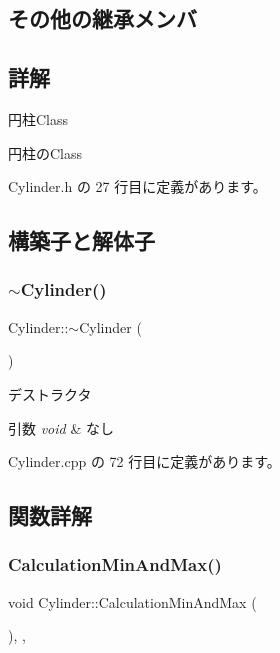 \subsection*{その他の継承メンバ}


\subsection{詳解}
円柱\+Class 

円柱の\+Class 

 Cylinder.\+h の 27 行目に定義があります。



\subsection{構築子と解体子}
\mbox{\label{class_cylinder_a05ab556f0ae3cd6e99d9d1f3caca80b3}} 
\subsubsection{\texorpdfstring{$\sim$\+Cylinder()}{~Cylinder()}}
{\footnotesize\ttfamily Cylinder\+::$\sim$\+Cylinder (\begin{DoxyParamCaption}{ }\end{DoxyParamCaption})}



デストラクタ 


\begin{DoxyParams}{引数}
{\em void} & なし \\
\hline
\end{DoxyParams}


 Cylinder.\+cpp の 72 行目に定義があります。



\subsection{関数詳解}
\mbox{\label{class_cylinder_ac8fb25627ff41e9ae265cd80bfbde03a}} 
\subsubsection{\texorpdfstring{Calculation\+Min\+And\+Max()}{CalculationMinAndMax()}}
{\footnotesize\ttfamily void Cylinder\+::\+Calculation\+Min\+And\+Max (\begin{DoxyParamCaption}{ }\end{DoxyParamCaption})\hspace{0.3cm}{\ttfamily [override]}, {\ttfamily [private]}, {\ttfamily [virtual]}}



